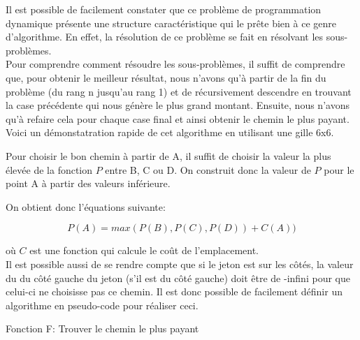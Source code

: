 \documentclass[devoir3.tex]{subfiles}
\begin{document}
Il est possible de facilement constater que ce problème de programmation dynamique présente une structure caractéristique qui le prête bien à ce genre d'algorithme. En effet, la résolution de ce problème se fait en résolvant les sous-problèmes.\\

Pour comprendre comment résoudre les sous-problèmes, il suffit de comprendre que, pour obtenir le meilleur résultat, nous n'avons qu'à partir de la fin du problème (du rang n jusqu'au rang 1) et de récursivement descendre en trouvant la case précédente qui nous génère le plus grand montant. Ensuite, nous n'avons qu'à refaire cela pour chaque case final et ainsi obtenir le chemin le plus payant.\\

Voici un démonstatration rapide de cet algorithme en utilisant une gille 6x6.\\


Pour choisir le bon chemin à partir de A, il suffit de choisir la valeur la plus élevée de la fonction \( P \) entre B, C ou D. On construit donc la valeur de \( P \) pour le point A à partir des valeurs inférieure.

On obtient donc l'équations suivante:

\[ P(A) = max(P(B), P(C), P(D)) + C(A)) \]

où \( C \) est une fonction qui calcule le coût de l'emplacement.\\

Il est possible aussi de se rendre compte que si le jeton est sur les côtés, la valeur du du côté gauche du jeton (s'il est du côté gauche) doit être de -infini pour que celui-ci ne choisisse pas ce chemin. Il est donc possible de facilement définir un algorithme en pseudo-code pour réaliser ceci.\\

\begin{algorithm}[H]




      \caption{Fonction F: Trouver le chemin le plus payant}
\end{algorithm}
\end{document}
